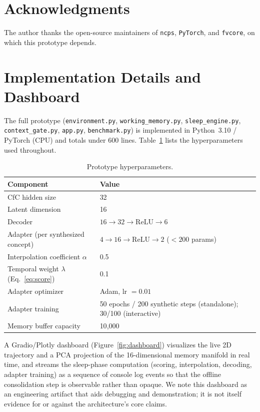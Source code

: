 \documentclass[11pt]{article}
\begin{document}
\section*{Acknowledgments}
The author thanks the open-source maintainers of \texttt{ncps}, \texttt{PyTorch}, and \texttt{fvcore}, on which this prototype depends.

\appendix
\section{Implementation Details and Dashboard}

The full prototype (\texttt{environment.py}, \texttt{working\_memory.py}, \texttt{sleep\_engine.py}, \texttt{context\_gate.py}, \texttt{app.py}, \texttt{benchmark.py}) is implemented in Python~3.10 / PyTorch (CPU) and totals under 600 lines. Table~\ref{tab:hparams} lists the hyperparameters used throughout.

\begin{table}[htbp]
\centering
\caption{Prototype hyperparameters.}
\label{tab:hparams}
\begin{tabular}{ll}
\toprule
Component & Value \\
\midrule
CfC hidden size & 32 \\
Latent dimension & 16 \\
Decoder & $16 \to 32 \to \mathrm{ReLU} \to 6$ \\
Adapter (per synthesized concept) & $4 \to 16 \to \mathrm{ReLU} \to 2$ ($<200$ params) \\
Interpolation coefficient $\alpha$ & 0.5 \\
Temporal weight $\lambda$ (Eq.~\ref{eq:score}) & 0.1 \\
Adapter optimizer & Adam, lr $=0.01$ \\
Adapter training & 50 epochs / 200 synthetic steps (standalone); 30/100 (interactive) \\
Memory buffer capacity & 10{,}000 \\
\bottomrule
\end{tabular}
\end{table}

A Gradio/Plotly dashboard (Figure~\ref{fig:dashboard}) visualizes the live 2D trajectory and a PCA projection of the 16-dimensional memory manifold in real time, and streams the sleep-phase computation (scoring, interpolation, decoding, adapter training) as a sequence of console log events so that the offline consolidation step is observable rather than opaque. We note this dashboard as an engineering artifact that aids debugging and demonstration; it is not itself evidence for or against the architecture's core claims.
\end{document}
